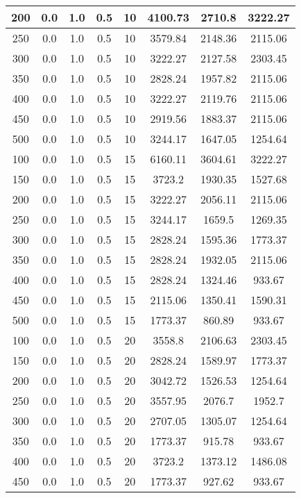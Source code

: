 \documentclass[a4paper, 12pt]{extreport}
\begin{document}
\begin{itemize}
\begin{longtable}{|c|c|c|c|c|c|c|c|}
			200 & 0.0 & 1.0 & 0.5 & 10 & 4100.73 & 2710.8 & 3222.27 \\\hline
			250 & 0.0 & 1.0 & 0.5 & 10 & 3579.84 & 2148.36 & 2115.06 \\\hline
			300 & 0.0 & 1.0 & 0.5 & 10 & 3222.27 & 2127.58 & 2303.45 \\\hline
			350 & 0.0 & 1.0 & 0.5 & 10 & 2828.24 & 1957.82 & 2115.06 \\\hline
			400 & 0.0 & 1.0 & 0.5 & 10 & 3222.27 & 2119.76 & 2115.06 \\\hline
			450 & 0.0 & 1.0 & 0.5 & 10 & 2919.56 & 1883.37 & 2115.06 \\\hline
			500 & 0.0 & 1.0 & 0.5 & 10 & 3244.17 & 1647.05 & 1254.64 \\\hline
			100 & 0.0 & 1.0 & 0.5 & 15 & 6160.11 & 3604.61 & 3222.27 \\\hline
			150 & 0.0 & 1.0 & 0.5 & 15 & 3723.2 & 1930.35 & 1527.68 \\\hline
			200 & 0.0 & 1.0 & 0.5 & 15 & 3222.27 & 2056.11 & 2115.06 \\\hline
			250 & 0.0 & 1.0 & 0.5 & 15 & 3244.17 & 1659.5 & 1269.35 \\\hline
			300 & 0.0 & 1.0 & 0.5 & 15 & 2828.24 & 1595.36 & 1773.37 \\\hline
			350 & 0.0 & 1.0 & 0.5 & 15 & 2828.24 & 1932.05 & 2115.06 \\\hline
			400 & 0.0 & 1.0 & 0.5 & 15 & 2828.24 & 1324.46 & 933.67 \\\hline
			450 & 0.0 & 1.0 & 0.5 & 15 & 2115.06 & 1350.41 & 1590.31 \\\hline
			500 & 0.0 & 1.0 & 0.5 & 15 & 1773.37 & 860.89 & 933.67 \\\hline
			100 & 0.0 & 1.0 & 0.5 & 20 & 3558.8 & 2106.63 & 2303.45 \\\hline
			150 & 0.0 & 1.0 & 0.5 & 20 & 2828.24 & 1589.97 & 1773.37 \\\hline
			200 & 0.0 & 1.0 & 0.5 & 20 & 3042.72 & 1526.53 & 1254.64 \\\hline
			250 & 0.0 & 1.0 & 0.5 & 20 & 3557.95 & 2076.7 & 1952.7 \\\hline
			300 & 0.0 & 1.0 & 0.5 & 20 & 2707.05 & 1305.07 & 1254.64 \\\hline
			350 & 0.0 & 1.0 & 0.5 & 20 & 1773.37 & 915.78 & 933.67 \\\hline
			400 & 0.0 & 1.0 & 0.5 & 20 & 3723.2 & 1373.12 & 1486.08 \\\hline
			450 & 0.0 & 1.0 & 0.5 & 20 & 1773.37 & 927.62 & 933.67 \\\hline

\end{longtable}
\end{itemize}
\end{document}
